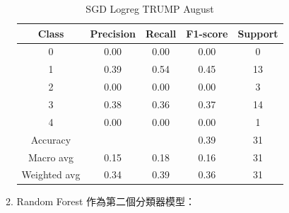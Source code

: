 \begin{enumerate}
\begin{enumerate}
\begin{table}[H]
                \vspace{1em} %
                
                \scriptsize
                \begin{tabular}{c|cccc}
                \hline
                Class & Precision & Recall & F1-score & Support \\
                \hline
                0 & 0.00 & 0.00 & 0.00 & 0 \\
                1 & 0.39 & 0.54 & 0.45 & 13 \\
                2 & 0.00 & 0.00 & 0.00 & 3 \\
                3 & 0.38 & 0.36 & 0.37 & 14 \\
                4 & 0.00 & 0.00 & 0.00 & 1 \\
                \hline
                Accuracy &       &      & 0.39 & 31 \\
                Macro avg & 0.15 & 0.18 & 0.16 & 31 \\
                Weighted avg & 0.34 & 0.39 & 0.36 & 31 \\
                \hline
                \end{tabular}
                \caption{SGD Logreg TRUMP August}
                \label{tab:classifier_2_report_sgd_logreg_trump_non_filtered_aug}
                \end{table}


                \pagebreak
    
                \item Random Forest 作為第二個分類器模型：


\end{enumerate}
\end{enumerate}
